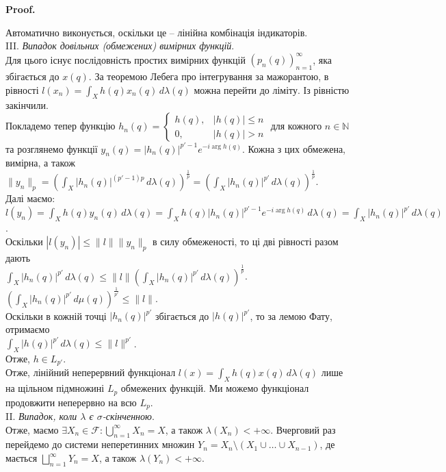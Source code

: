 \documentclass[a4paper, 10pt]{article}
\makeatletter
\theoremstyle{theoremdd}
\renewenvironment{proof}[1][Proof.\\]{\par
\pushQED{\hfill \qed}%
\normalfont \topsep6\p@\@plus6\p@\relax
\trivlist
\item\relax
{\bfseries
#1\@addpunct{.}}\hspace\labelsep\ignorespaces
}{%
\popQED\endtrivlist\@endpefalse
}
\makeatother
\begin{document}
\begin{proof}
Автоматично виконується, оскільки це -- лінійна комбінація індикаторів.\\
III. \textit{Випадок довільних (обмежених) вимірних функцій}.\\
Для цього існує послідовність простих вимірних функцій $(p_n(q))_{n=1}^\infty$, яка збігається до $x(q)$. За теоремою Лебега про інтегрування за мажорантою, в рівності $l(x_n) = \displaystyle\int_X h(q) x_n(q)\,d\lambda(q)$ можна перейти до ліміту. Із рівністю закінчили.\\
Покладемо тепер функцію $h_n(q) = \begin{cases} h(q), & |h(q)| \leq n \\ 0, & |h(q)| > n \end{cases}$ для кожного $n \in \mathbb{N}$ та розглянемо функції $y_n(q) = |h_n(q)|^{p'-1} e^{-i \arg h(q)}$. Кожна з цих обмежена, вимірна, а також\\
$\|y_n\|_p = \displaystyle\left(  \int_X |h_n(q)|^{(p'-1)p}\,d\lambda(q) \right)^{\frac{1}{p}} = \left( \int_X |h_n(q)|^{p'}\,d\lambda(q)\right)^{\frac{1}{p}}$.\\
Далі маємо:\\
$l(y_n) = \displaystyle\int_X h(q) y_n(q)\,d\lambda(q) = \int_X h(q) |h_n(q)|^{p'-1} e^{-i \arg h(q)}\,d\lambda(q) = \int_X |h_n(q)|^{p'}\,d\lambda(q)$.\\
Оскільки $|l(y_n)| \leq \|l\| \|y_n\|_p$ в силу обмеженості, то ці дві рівності разом дають\\
$\displaystyle\int_X |h_n(q)|^{p'}\,d\lambda(q) \leq \|l\| \left( \int_X |h_n(q)|^{p'}\,d\lambda(q) \right)^{\frac{1}{p}}$.\\
$\displaystyle\left( \int_X |h_n(q)|^{p'}\,d\mu(q) \right)^{\frac{1}{p'}} \leq \|l\|$.\\
Оскільки в кожній точці $|h_n(q)|^{p'}$ збігається до $|h(q)|^{p'}$, то за лемою Фату, отримаємо\\
$\displaystyle\int_X |h(q)|^{p'}\,d\lambda(q) \leq \|l\|^{p'}$.\\
Отже, $h \in L_{p'}$.\\
Отже, лінійний неперервний функціонал $l(x) = \displaystyle\int_X h(q)x(q)\,d\lambda(q)$ лише на щільном підмножині $L_p$ обмежених функцій. Ми можемо функціонал продовжити неперервно на всю $L_p$.
\bigskip \\
II. \textit{Випадок, коли $\lambda$ є $\sigma$-скінченною}.\\
Отже, маємо $\exists X_n \in \mathcal{F}: \displaystyle \bigcup_{n=1}^\infty X_n = X$, а також $\lambda(X_n) < +\infty$. Вчерговий раз перейдемо до системи неперетинних множин $Y_n = X_n \setminus (X_1 \cup \dots \cup X_{n-1})$, де мається $\displaystyle\bigsqcup_{n=1}^\infty Y_n = X$, а також $\lambda(Y_n) < +\infty$.\\

\end{proof}
\end{document}

